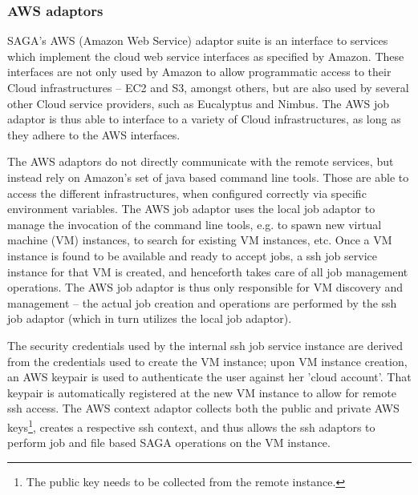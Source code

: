 \documentclass[conference,final]{IEEEtran}
\newcommand{\upp}{\vspace*{-0.6em}}
\begin{document}
\upp
\subsubsection{AWS adaptors}

SAGA's AWS (Amazon Web Service) adaptor suite is
an interface to services which implement the cloud web service
interfaces as specified by Amazon. %
These interfaces are not only used by Amazon to allow programmatic
access to their Cloud infrastructures -- EC2 and S3, amongst others,
but are also used by several other Cloud service providers, such as
Eucalyptus\cite{eucalyptus} and Nimbus.  The AWS job adaptor is thus able to
interface to a variety of Cloud infrastructures, as long as they
adhere to the AWS interfaces.

The AWS adaptors do not directly communicate with the remote services,
but instead rely on Amazon's set of java based command line tools.
Those are able to access the different infrastructures, when configured
correctly via specific environment variables.  The AWS job adaptor
uses the local job adaptor to manage the invocation of the command
line tools, e.g. to spawn new virtual machine (VM) instances, to
search for existing VM instances, etc.  Once a VM instance is found to
be available and ready to accept jobs, a ssh job service instance for
that VM is created, and henceforth takes care of all job management
operations.  The AWS job adaptor is thus only responsible for VM
discovery and management -- the actual job creation and operations are
performed by the ssh job adaptor (which in turn utilizes the local job
adaptor).

The security credentials used by the internal ssh job service
instance are derived from the credentials used to create 
the VM instance; upon VM instance creation, an AWS keypair is
used to authenticate the user against her 'cloud account'.  That
keypair is automatically registered at the new VM instance to allow
for remote ssh access.  The AWS context adaptor collects both the
public and private AWS keys\footnote{The public key needs to be
  collected from the remote instance.}, creates a respective ssh
context, and thus allows the ssh adaptors to perform job and file
based SAGA operations on the VM instance.
\end{document}
